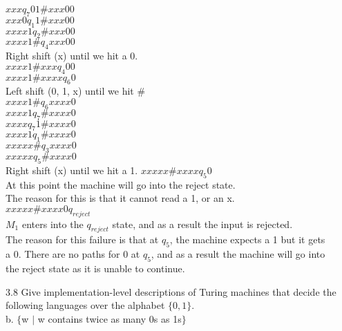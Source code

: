 \documentclass[12pt]{article}
\begin{document}
$xxx                q_7    01 \# xxx00$ \\
$xxx0               q_1     1 \# xxx00$ \\
$xxxx1              q_2       \# xxx00$ \\
$xxxx1 \#           q_4          xxx00$ \\
Right shift (x) until we hit a 0.       \\
$xxxx1 \# xxx       q_4             00$ \\
$xxxx1 \# xxxx      q_6              0$ \\
Left shift (0, 1, x) until we hit  $\#$ \\
$xxxx1 \#           q_6          xxxx0$ \\
$xxxx1              q_7      \#  xxxx0$ \\
$xxxx               q_7    1 \#  xxxx0$ \\
$xxxx1              q_1      \#  xxxx0$ \\
$xxxxx  \#          q_3          xxxx0$ \\
$xxxxx              q_5      \#  xxxx0$ \\
Right shift (x) until we hit a 1.
$xxxxx \#  xxxx     q_5              0$ \\
At this point the machine will go into the reject state. \\
The reason for this is that it cannot read a 1, or an x. \\
$xxxxx \#  xxxx0    q_{reject}        $ \\
$M_1$ enters into the $q_{reject}$ state, and as a result the input is rejected. \\

The reason for this failure is that at $q_5$, the machine expects a 1 but it gets \\
a 0. There are no paths for 0 at $q_5$, and as a result the machine will go into \\
the reject state as it is unable to continue. \\


\pagebreak

3.8 Give implementation-level descriptions of Turing machines that decide the following
languages over the alphabet $\{0,1\}$. \\

b. $\{$w $\mid$ w contains twice as many 0s as 1s$\}$ \\
\end{document}
